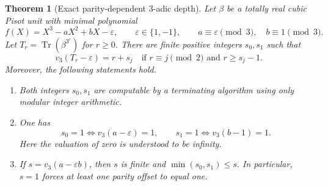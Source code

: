 \documentclass[11pt,a4paper]{article}
\newtheorem{theorem}{Theorem}[section]
\theoremstyle{definition}
\theoremstyle{remark}
\numberwithin{equation}{section}
\begin{document}
\begin{theorem}[Exact parity-dependent $3$-adic depth]
\label{ft:thm:final-parity-depth}
Let $\beta$ be a totally real cubic Pisot unit with minimal polynomial
\[
 f(X)=X^3-aX^2+bX-\varepsilon,
 \qquad \varepsilon\in\{1,-1\},\qquad
 a\equiv\varepsilon\pmod3,\quad b\equiv1\pmod3.
\]
Let $T_r=\operatorname{Tr}(\beta^{3^r})$ for $r\ge0$.
There are finite positive integers $s_0,s_1$ such that
\[
 \boxed{v_3(T_r-\varepsilon)=r+s_j
 \quad\text{if }r\equiv j\pmod2\text{ and }r\ge s_j-1.}
\]
Moreover, the following statements hold.
\begin{enumerate}
\item Both integers $s_0,s_1$ are computable by a terminating
algorithm using only modular integer arithmetic.
\item One has
\[
 s_0=1\iff v_3(a-\varepsilon)=1,
 \qquad s_1=1\iff v_3(b-1)=1.
\]
Here the valuation of zero is understood to be infinity.
\item If $s=v_3(a-\varepsilon b)$, then $s$ is finite and
$\min(s_0,s_1)\le s$. In particular, $s=1$ forces at least one
parity offset to equal one.
\end{enumerate}
\end{theorem}
\end{document}
